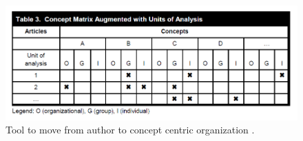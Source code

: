 \documentclass{TC}
\begin{document}
\begin{figure}[h]

\begin{mdframed}
\centering
\includegraphics[width=.85\textwidth]{Author_to_Concept_Centric}
\end{mdframed}
\caption{Tool to move from author to concept centric organization \parencite{webster_analyzing_2002}.}\label{fig:Author_to_Concept_Centric}
\end{figure}
\end{document}
